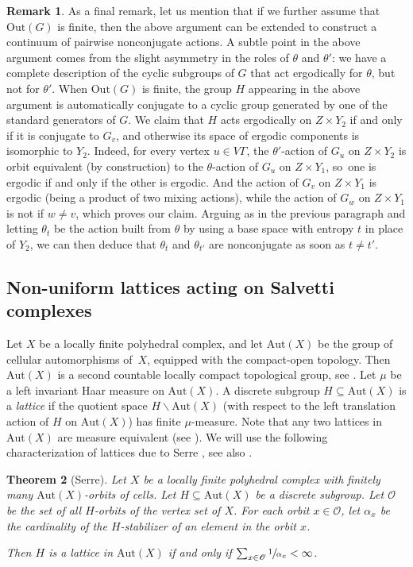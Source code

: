 \documentclass[JEP,XML,SOM,Unicode,NoFloatCountersInSection,published]{cedram}
\let\mathcal\mathscr
\theoremstyle{plain}
\newtheorem{theo}{Theorem}[section]
\theoremstyle{definition}
\newtheorem{rk}[theo]{Remark}
\newcommand{\Aut}{\mathrm{Aut}}
\newcommand{\Out}{\mathrm{Out}}
\begin{document}
\begin{rk}
As a final remark, let us mention that if we further assume that $\Out(G)$ is finite, then the above argument can be extended to construct a continuum of pairwise nonconjugate actions. A subtle point in the above argument comes from the slight asymmetry in the roles of $\theta$ and $\theta'$: we have a complete description of the cyclic subgroups of $G$ that act ergodically for $\theta$, but not for $\theta'$. When $\Out(G)$ is finite, the group $H$ appearing in the above argument is automatically conjugate to a cyclic group generated by one of the standard generators of $G$. We claim that $H$ acts ergodically on $Z\times Y_2$ if and only if it is conjugate to $G_v$, and otherwise its space of ergodic components is isomorphic to $Y_2$. Indeed, for every vertex $u\in V\Gamma$, the $\theta'$-action of $G_u$ on $Z\times Y_2$ is orbit equivalent (by construction) to the $\theta$-action of $G_u$ on $Z\times Y_1$, so~one is ergodic if and only if the other is ergodic. And the action of $G_v$ on $Z\times Y_1$ is ergodic (being a product of two mixing actions), while the action of $G_w$ on $Z\times Y_1$ is not if $w\neq v$, which proves our claim. Arguing as in the previous paragraph and letting $\theta_t$ be the action built from $\theta$ by using a base space with entropy $t$ in place of $Y_2$, we can then deduce that $\theta_t$ and $\theta_{t'}$ are nonconjugate as soon as $t\neq t'$.
\end{rk}

\subsection{Non-uniform lattices acting on Salvetti complexes}

Let $X$ be a locally finite polyhedral complex, and let $\Aut(X)$ be the group of cellular automorphisms of~$X$, equipped with the compact-open topology. Then $\Aut(X)$ is a second countable locally compact topological group, see \eg \cite[Ex.\,5.B.11]{cornulier2014metric}. Let $\mu$ be a left invariant Haar measure on $\Aut(X)$. A discrete subgroup $H\subseteq \Aut(X)$ is a \emph{lattice} if the quotient space $H\backslash\Aut(X)$ (with respect to the left translation action of $H$ on $\Aut(X)$) has finite $\mu$-measure. Note that any two lattices in $\Aut(X)$ are measure equivalent (see \eg \cite[Ex.\,1.2]{Fur}). We will use the following characterization of lattices due to Serre \cite{Serre}, see also \cite[Chap.\,1.5]{bass2001tree}.

\begin{theo}[Serre]
\label{theo:non-uniform lattice}
Let $X$ be a locally finite polyhedral complex with finitely many $\Aut(X)$-orbits of cells. Let $H\subseteq \Aut(X)$ be a discrete subgroup. Let $\mathcal{O}$ be the set of all $H$-orbits of the vertex set of $X$. For each orbit $x\in\mathcal{O}$, let $\alpha_x$ be the cardinality of the $H$-stabilizer of an element in the orbit $x$.

Then $H$ is a lattice in $\Aut(X)$ if and only if $\sum_{x\in \mathcal{O}}\sfrac{1}{\alpha_x}<\infty$.
\end{theo}
\end{document}
